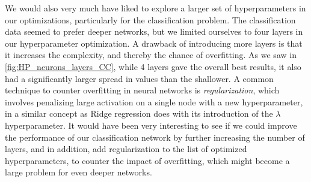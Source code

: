 \documentclass[10pt, twocolumn]{article}
\begin{document}
We would also very much have liked to explore a larger set of hyperparameters in our optimizations, particularly for the classification problem. The classification data seemed to prefer deeper networks, but we limited ourselves to four layers in our hyperparameter optimization. A drawback of introducing more layers is that it increases the complexity, and thereby the chance of overfitting. As we saw in \cref{fig:HP_neurons_layers_CC}, while 4 layers gave the overall best results, it also had a significantly larger spread in values than the shallower. A common technique to counter overfitting in neural networks is \textit{regularization}, which involves penalizing large activation on a single node with a new hyperparameter, in a similar concept as Ridge regression does with its introduction of the $\lambda$ hyperparameter. It would have been very interesting to see if we could improve the performance of our classification network by further increasing the number of layers, and in addition, add regularization to the list of optimized hyperparameters, to counter the impact of overfitting, which might become a large problem for even deeper networks.
\end{document}
